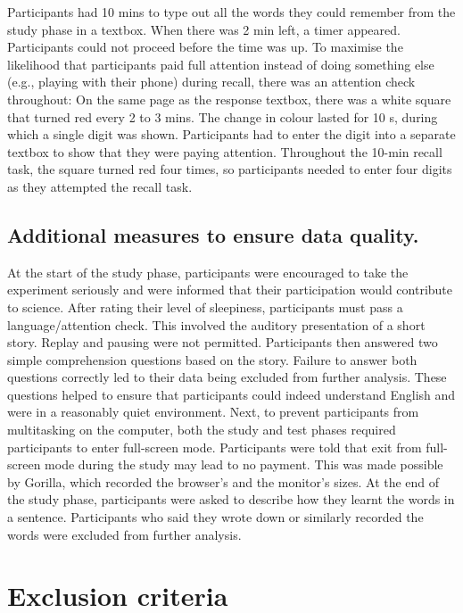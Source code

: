 \documentclass[
]{article}
\begin{document}
Participants had 10 mins to type out all the words they could remember from the study phase in a textbox. When there was 2 min left, a timer appeared. Participants could not proceed before the time was up.
To maximise the likelihood that participants paid full attention instead of doing something else (e.g., playing with their phone) during recall, there was an attention check throughout: On the same page as the response textbox, there was a white square that turned red every 2 to 3 mins. The change in colour lasted for 10 s, during which a single digit was shown. Participants had to enter the digit into a separate textbox to show that they were paying attention. Throughout the 10-min recall task, the square turned red four times, so participants needed to enter four digits as they attempted the recall task.

\hypertarget{additional-measures-to-ensure-data-quality.}{%
\subsection{Additional measures to ensure data quality.}\label{additional-measures-to-ensure-data-quality.}}

At the start of the study phase, participants were encouraged to take the experiment seriously and were informed that their participation would contribute to science. After rating their level of sleepiness, participants must pass a language/attention check. This involved the auditory presentation of a short story. Replay and pausing were not permitted. Participants then answered two simple comprehension questions based on the story. Failure to answer both questions correctly led to their data being excluded from further analysis. These questions helped to ensure that participants could indeed understand English and were in a reasonably quiet environment. Next, to prevent participants from multitasking on the computer, both the study and test phases required participants to enter full-screen mode. Participants were told that exit from full-screen mode during the study may lead to no payment. This was made possible by Gorilla, which recorded the browser's and the monitor's sizes. At the end of the study phase, participants were asked to describe how they learnt the words in a sentence. Participants who said they wrote down or similarly recorded the words were excluded from further analysis.

\hypertarget{exclusion-criteria}{%
\section{Exclusion criteria}\label{exclusion-criteria}}
\end{document}
